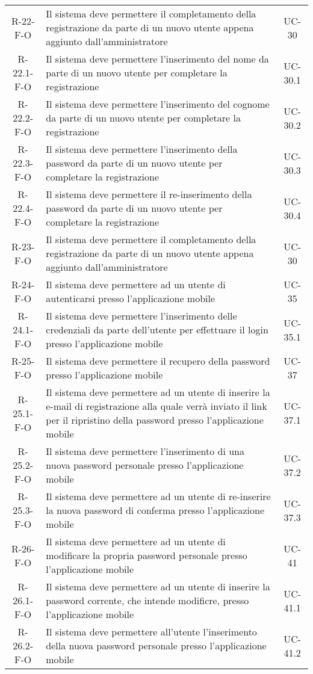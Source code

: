 \begin{longtable}{ c C{9.5cm} c }
    R-22-F-O & Il sistema deve permettere il completamento della registrazione da parte di un nuovo utente appena aggiunto dall'amministratore& UC- 30\\
    R-22.1-F-O & Il sistema deve permettere l'inserimento del nome da parte di un nuovo utente per completare la registrazione& UC- 30.1\\
    R-22.2-F-O & Il sistema deve permettere l'inserimento del cognome da parte di un nuovo utente per completare la registrazione& UC- 30.2\\
    R-22.3-F-O & Il sistema deve permettere l'inserimento della password da parte di un nuovo utente per completare la registrazione& UC- 30.3\\
    R-22.4-F-O & Il sistema deve permettere il re-inserimento della password da parte di un nuovo utente per completare la registrazione& UC- 30.4\\
    R-23-F-O & Il sistema deve permettere il completamento della registrazione da parte di un nuovo utente appena aggiunto dall'amministratore& UC- 30\\
    R-24-F-O & Il sistema deve permettere ad un utente di autenticarsi presso l'applicazione mobile& UC-35\\
    R-24.1-F-O & Il sistema deve permettere l'inserimento delle credenziali da parte dell'utente per effettuare il login presso l'applicazione mobile& UC-35.1\\
    R-25-F-O & Il sistema deve permettere il recupero della password presso l'applicazione mobile& UC-37\\
    R-25.1-F-O & Il sistema deve permettere ad un utente di inserire la e-mail di registrazione alla quale verrà inviato il link per il ripristino della password presso l'applicazione mobile& UC-37.1\\
    R-25.2-F-O & Il sistema deve permettere l'inserimento di una nuova password personale presso l'applicazione mobile& UC-37.2\\
    R-25.3-F-O & Il sistema deve permettere ad un utente di re-inserire la nuova password di conferma presso l'applicazione mobile& UC-37.3\\
    R-26-F-O & Il sistema deve permettere ad un utente di modificare la propria password personale presso l'applicazione mobile& UC-41\\
    R-26.1-F-O & Il sistema deve permettere ad un utente di inserire la password corrente, che intende modificre, presso l'applicazione mobile& UC-41.1\\
    R-26.2-F-O & Il sistema deve permettere all'utente l'inserimento della nuova password personale presso l'applicazione mobile& UC-41.2\\

\end{longtable}
